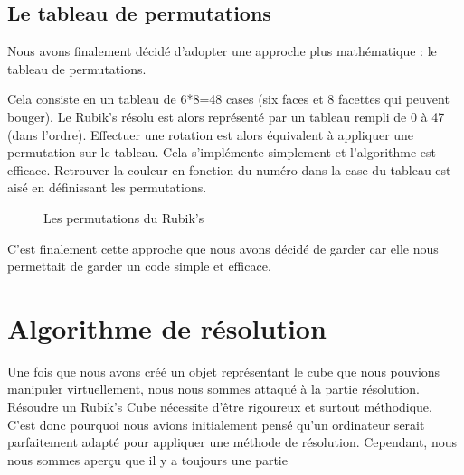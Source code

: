 \subsection{Le tableau de permutations}
Nous avons finalement décidé d'adopter une approche plus mathématique : le tableau de permutations.

Cela consiste en un tableau de 6*8=48 cases (six faces et 8 facettes qui peuvent bouger).
Le Rubik's résolu est alors représenté par un tableau rempli de 0 à 47 (dans l'ordre).
Effectuer une rotation est alors équivalent à appliquer une permutation sur le tableau.
Cela s'implémente simplement et l'algorithme est efficace.
Retrouver la couleur en fonction du numéro dans la case du tableau est aisé en définissant les permutations.

\begin{figure}[h]
\begin{center}
\end{center}
    \caption{Les permutations du Rubik's}
\end{figure}

C'est finalement cette approche que nous avons décidé de garder car elle nous permettait de garder un code simple et efficace.

\section{Algorithme de résolution}
Une fois que nous avons créé un objet représentant le cube que nous pouvions manipuler virtuellement, nous nous sommes attaqué à la partie résolution.
Résoudre un Rubik's Cube nécessite d'être rigoureux et surtout méthodique.
C'est donc pourquoi nous avions initialement pensé qu'un ordinateur serait parfaitement adapté pour appliquer une méthode de résolution.
Cependant, nous nous sommes aperçu que il y a toujours une partie 

